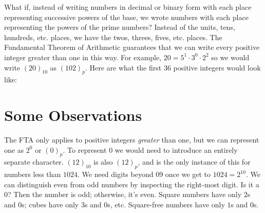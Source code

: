 \documentclass[12pt]{article}
\begin{document}
\noindent What if, instead of writing numbers in decimal or binary form with each place representing successive powers of the base, we wrote numbers with each place representing the powers of the prime numbers? Instead of the units, tens, hundreds, etc. places, we have the twos, threes, fives, etc. places. The Fundamental Theorem of Arithmetic guarantees that we can write every positive integer greater than one in this way. For example, $20 = 5^1 \cdot 3^0 \cdot 2^2$ so we would write $(20)_{10}$ as $(102)_p$. Here are what the first 36 positive integers would look like:

\ttfamily \small
{}
\normalfont \normalsize

\section*{Some Observations}
\noindent The FTA only applies to positive integers \textit{greater} than one, but we can represent one as $2^0$ or $(0)_p$. To represent $0$ we would need to introduce an entirely separate character. $(12)_{10}$ is also $(12)_p$, and is the only instance of this for numbers less than $1024$. We need digits beyond $0$\textendash$9$ once we get to $1024 = 2^{10}$. We can distinguish even from odd numbers by inspecting the right-most digit. Is it a $0$? Then the number is odd; otherwise, it's even. Square numbers have only $2$s and $0$s; cubes have only $3$s and $0$s, etc. Square-free numbers have only $1$s and $0$s.
\end{document}
